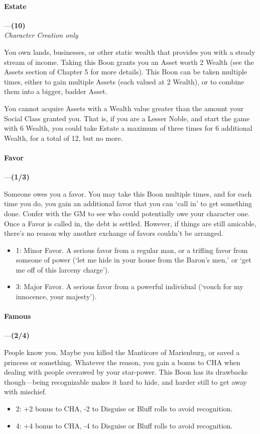 \documentclass[oneside,11pt,english]{book}
\begin{document}
\paragraph{\label{boon:Estate}Estate}---\quad\textbf{(10)}\\
\textit{Character Creation only}\par
You own lands, businesses, or other static wealth that provides you with a steady stream of income. 
Taking this Boon grants you an Asset worth 2 Wealth (see the Assets section of Chapter 5 for more 
details). This Boon can be taken multiple times, either to gain multiple Assets (each valued at 2 Wealth), 
or to combine them into a bigger, badder Asset. 


You cannot acquire Assets with a Wealth value greater than the amount your Social Class granted you. 
That is, if you are a Lesser Noble, and start the game with 6 Wealth, you could take Estate a maximum of 
three times for 6 additional Wealth, for a total of 12, but no more. 
\paragraph{\label{boon:Favor}Favor}---\quad\textbf{(1/3)}\par
Someone owes you a favor. You may take this Boon multiple times, and for each time you do, you gain 
an additional favor that you can ‘call in’ to get something done. Confer with the GM to see who could 
potentially owe your character one. Once a Favor is called in, the debt is settled. However, if things are 
still amicable, there's no reason why another exchange of favors couldn't be arranged. 
\begin{itemize}
\item 1: Minor Favor. A serious favor from a regular man, or a trifling favor from someone of power (‘let me hide in your house from the Baron's men,’ or ‘get me off of this larceny charge’).
\item 3: Major Favor. A serious favor from a powerful individual (‘vouch for my innocence, your majesty’).
\end{itemize}

\paragraph{\label{boon:Famous}Famous}---\quad\textbf{(2/4)}\par
People know you. Maybe you killed the Manticore of Marienburg, or saved a princess or something. 
Whatever the reason, you gain a bonus to CHA when dealing with people overawed by your star-power. 
This Boon has its drawbacks though—being recognizable makes it hard to hide, and harder still to get 
away with mischief.
\begin{itemize}
\item 2: +2 bonus to CHA, -2 to Disguise or Bluff rolls to avoid recognition. 
\item 4: +4 bonus to CHA, -4 to Disguise or Bluff rolls to avoid recognition. 
\end{itemize}
\end{document}

